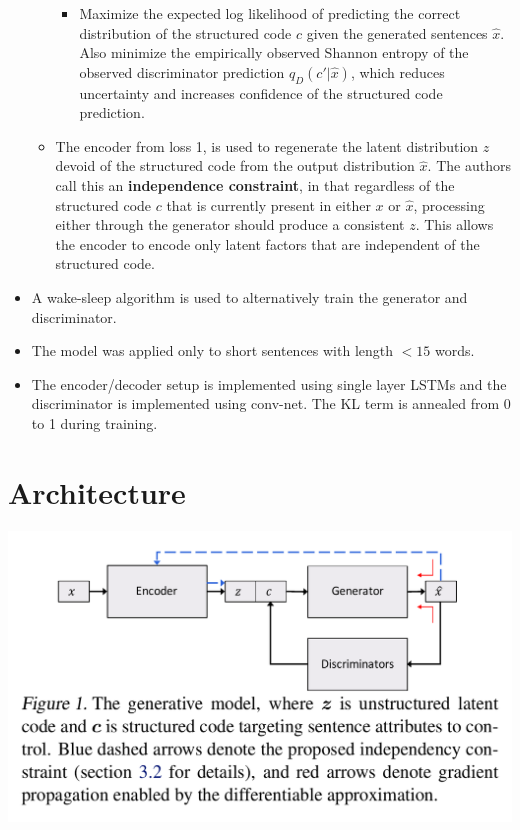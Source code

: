 \documentclass[12pt]{article}
\begin{document}
\begin{itemize}
\begin{itemize}
\begin{itemize}
        \item Maximize the expected log likelihood of predicting the correct distribution of the structured code $c$ given the generated sentences $\hat{x}$. Also minimize the empirically observed Shannon entropy of the observed discriminator prediction $q_D(c\prime|\hat{x})$, which reduces uncertainty and increases confidence of the structured code prediction.
      \end{itemize}
      \item The encoder from loss 1, is used to regenerate the latent distribution $z$ devoid of the structured code from the output distribution $\hat{x}$. The authors call this an \textbf{independence constraint}, in that regardless of the structured code $c$ that is currently present in either $x$ or $\hat{x}$, processing either through the generator should produce a consistent $z$. This allows the encoder to encode only latent factors that are independent of the structured code.
    \end{itemize}
    \item A wake-sleep algorithm \cite{hinton1995wake} is used to alternatively train the generator and discriminator.
    \item The model was applied only to short sentences with length $<15$ words.
    \item The encoder/decoder setup is implemented using single layer LSTMs and the discriminator is implemented using conv-net. The KL term is annealed from 0 to 1 during training.
  \end{itemize}

\section{Architecture}
  \includegraphics[width=\textwidth]{architecture}
\end{document}
